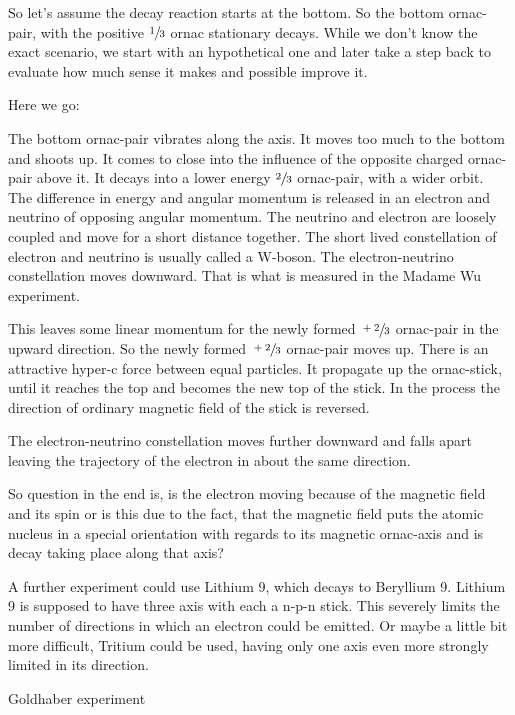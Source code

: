 So let's assume the decay reaction starts at the bottom. So the bottom ornac-pair, with the positive $\sfrac{1}{3}$ ornac stationary decays. While we don't know the exact scenario, we start with an hypothetical one and later take a step back to evaluate how much sense it makes and possible improve it.


Here we go:


The bottom ornac-pair vibrates along the axis. It moves too much to the bottom and shoots up. It comes to close into the influence of the opposite charged ornac-pair above it.
It decays into a lower energy $\sfrac{2}{3}$ ornac-pair, with a wider orbit. The difference in energy and angular momentum is released in an electron and neutrino of opposing angular momentum. The neutrino and electron are loosely coupled and move for a short distance together. The short lived constellation of electron and neutrino is usually called a W-boson. The electron-neutrino constellation moves downward. That is what is measured in the Madame Wu experiment.


 This leaves some linear momentum for the newly formed $\sfrac{+2}{3}$ ornac-pair in the upward direction.
So the newly formed $\sfrac{+2}{3}$ ornac-pair moves up. There is an attractive hyper-c force between equal particles. It propagate up the ornac-stick, until it reaches the top and becomes the new top of the stick.
In the process the direction of ordinary magnetic field of the stick is reversed.


The electron-neutrino constellation moves further downward and falls apart leaving the trajectory of the electron in about the same direction.


So question in the end is, is the electron moving because of the magnetic field and its spin or is this due to the fact, that the magnetic field puts the atomic nucleus in a special orientation with regards to its magnetic ornac-axis and is decay taking place along that axis?


A further experiment could use Lithium 9, which decays to Beryllium 9. Lithium 9 is supposed to have three axis with each a n-p-n stick. This severely limits the number of directions in which an electron could be emitted. Or maybe a little bit more difficult, Tritium could be used, having only one axis even more strongly limited in its direction.


Goldhaber experiment




